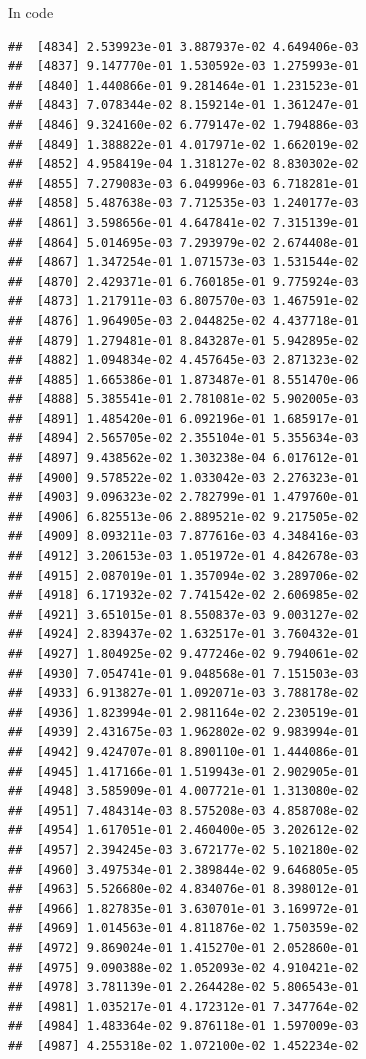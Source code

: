 \documentclass[ignorenonframetext,]{beamer}
\begin{document}
\begin{frame}[fragile]{In code}
\begin{verbatim}
##  [4834] 2.539923e-01 3.887937e-02 4.649406e-03
##  [4837] 9.147770e-01 1.530592e-03 1.275993e-01
##  [4840] 1.440866e-01 9.281464e-01 1.231523e-01
##  [4843] 7.078344e-02 8.159214e-01 1.361247e-01
##  [4846] 9.324160e-02 6.779147e-02 1.794886e-03
##  [4849] 1.388822e-01 4.017971e-02 1.662019e-02
##  [4852] 4.958419e-04 1.318127e-02 8.830302e-02
##  [4855] 7.279083e-03 6.049996e-03 6.718281e-01
##  [4858] 5.487638e-03 7.712535e-03 1.240177e-03
##  [4861] 3.598656e-01 4.647841e-02 7.315139e-01
##  [4864] 5.014695e-03 7.293979e-02 2.674408e-01
##  [4867] 1.347254e-01 1.071573e-03 1.531544e-02
##  [4870] 2.429371e-01 6.760185e-01 9.775924e-03
##  [4873] 1.217911e-03 6.807570e-03 1.467591e-02
##  [4876] 1.964905e-03 2.044825e-02 4.437718e-01
##  [4879] 1.279481e-01 8.843287e-01 5.942895e-02
##  [4882] 1.094834e-02 4.457645e-03 2.871323e-02
##  [4885] 1.665386e-01 1.873487e-01 8.551470e-06
##  [4888] 5.385541e-01 2.781081e-02 5.902005e-03
##  [4891] 1.485420e-01 6.092196e-01 1.685917e-01
##  [4894] 2.565705e-02 2.355104e-01 5.355634e-03
##  [4897] 9.438562e-02 1.303238e-04 6.017612e-01
##  [4900] 9.578522e-02 1.033042e-03 2.276323e-01
##  [4903] 9.096323e-02 2.782799e-01 1.479760e-01
##  [4906] 6.825513e-06 2.889521e-02 9.217505e-02
##  [4909] 8.093211e-03 7.877616e-03 4.348416e-03
##  [4912] 3.206153e-03 1.051972e-01 4.842678e-03
##  [4915] 2.087019e-01 1.357094e-02 3.289706e-02
##  [4918] 6.171932e-02 7.741542e-02 2.606985e-02
##  [4921] 3.651015e-01 8.550837e-03 9.003127e-02
##  [4924] 2.839437e-02 1.632517e-01 3.760432e-01
##  [4927] 1.804925e-02 9.477246e-02 9.794061e-02
##  [4930] 7.054741e-01 9.048568e-01 7.151503e-03
##  [4933] 6.913827e-01 1.092071e-03 3.788178e-02
##  [4936] 1.823994e-01 2.981164e-02 2.230519e-01
##  [4939] 2.431675e-03 1.962802e-02 9.983994e-01
##  [4942] 9.424707e-01 8.890110e-01 1.444086e-01
##  [4945] 1.417166e-01 1.519943e-01 2.902905e-01
##  [4948] 3.585909e-01 4.007721e-01 1.313080e-02
##  [4951] 7.484314e-03 8.575208e-03 4.858708e-02
##  [4954] 1.617051e-01 2.460400e-05 3.202612e-02
##  [4957] 2.394245e-03 3.672177e-02 5.102180e-02
##  [4960] 3.497534e-01 2.389844e-02 9.646805e-05
##  [4963] 5.526680e-02 4.834076e-01 8.398012e-01
##  [4966] 1.827835e-01 3.630701e-01 3.169972e-01
##  [4969] 1.014563e-01 4.811876e-02 1.750359e-02
##  [4972] 9.869024e-01 1.415270e-01 2.052860e-01
##  [4975] 9.090388e-02 1.052093e-02 4.910421e-02
##  [4978] 3.781139e-01 2.264428e-02 5.806543e-01
##  [4981] 1.035217e-01 4.172312e-01 7.347764e-02
##  [4984] 1.483364e-02 9.876118e-01 1.597009e-03
##  [4987] 4.255318e-02 1.072100e-02 1.452234e-02

\end{verbatim}
\end{frame}
\end{document}
